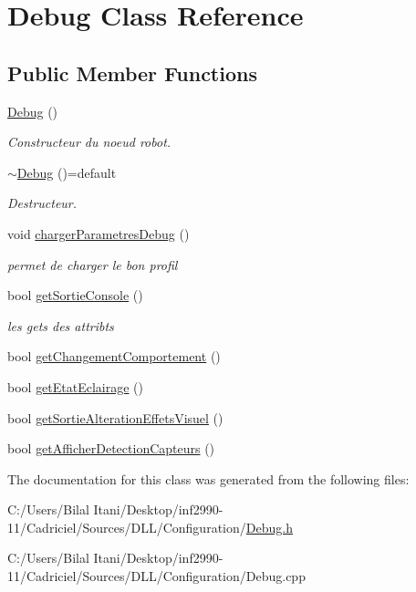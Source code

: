 \hypertarget{class_debug}{}\section{Debug Class Reference}
\label{class_debug}
\subsection*{Public Member Functions}
\begin{DoxyCompactItemize}
\item 
\hyperlink{group__inf2990_ga5b453c195c4cfffed2702c3330f53a64}{Debug} ()
\begin{DoxyCompactList}\small\item\em Constructeur du noeud robot. \end{DoxyCompactList}\item 
\hyperlink{class_debug_a1619b9b618cedfe7ad00eb8448c70dbd}{$\sim$\+Debug} ()=default\hypertarget{class_debug_a1619b9b618cedfe7ad00eb8448c70dbd}{}\label{class_debug_a1619b9b618cedfe7ad00eb8448c70dbd}

\begin{DoxyCompactList}\small\item\em Destructeur. \end{DoxyCompactList}\item 
void \hyperlink{group__inf2990_ga848d7b7972dc862d658ef56199ae7f1b}{charger\+Parametres\+Debug} ()
\begin{DoxyCompactList}\small\item\em permet de charger le bon profil \end{DoxyCompactList}\item 
bool \hyperlink{group__inf2990_ga5fa5cb128639746476faeb9acdae8960}{get\+Sortie\+Console} ()
\begin{DoxyCompactList}\small\item\em les gets des attribts \end{DoxyCompactList}\item 
bool \hyperlink{group__inf2990_ga5bab24788e48020082a328e2cfc7e2e3}{get\+Changement\+Comportement} ()
\item 
bool \hyperlink{group__inf2990_ga4e6a2ffa32e030b34d0c9caf91b72e06}{get\+Etat\+Eclairage} ()
\item 
bool \hyperlink{group__inf2990_ga2ecd4f482ca3f4f72a0c96dfec0700f3}{get\+Sortie\+Alteration\+Effets\+Visuel} ()
\item 
bool \hyperlink{group__inf2990_gaeace4e6d62ced2d397c3fe65055656d4}{get\+Afficher\+Detection\+Capteurs} ()
\end{DoxyCompactItemize}


The documentation for this class was generated from the following files\+:\begin{DoxyCompactItemize}
\item 
C\+:/\+Users/\+Bilal Itani/\+Desktop/inf2990-\/11/\+Cadriciel/\+Sources/\+D\+L\+L/\+Configuration/\hyperlink{_debug_8h}{Debug.\+h}\item 
C\+:/\+Users/\+Bilal Itani/\+Desktop/inf2990-\/11/\+Cadriciel/\+Sources/\+D\+L\+L/\+Configuration/Debug.\+cpp\end{DoxyCompactItemize}
